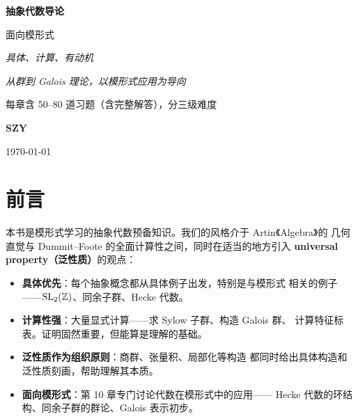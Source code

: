 \documentclass[12pt, a4paper, openany]{book}
\begin{document}
\raggedbottom

\begin{titlepage}

  \centering
  \vspace*{2.2cm}

  {\color{white}\fontsize{36}{44}\selectfont\bfseries 抽象代数导论\par}
  \vspace{0.4cm}
  {\color{white!90}\LARGE 面向模形式\par}
  \vspace{0.3cm}
  {\color{white!70}\large\itshape 具体、计算、有动机\par}

  \vspace{3cm}

  {\large\itshape 从群到 Galois 理论，以模形式应用为导向\par}
  \vspace{0.3cm}
  {\normalsize 每章含 50--80 道习题（含完整解答），分三级难度\par}

  \vfill

  {\Large\bfseries SZY\par}
  \vspace{0.3cm}
  {\normalsize \today\par}
  \vspace{2.5cm}
\end{titlepage}

\chapter*{前言}

本书是模形式学习的抽象代数预备知识。我们的风格介于 Artin《Algebra》的
几何直觉与 Dummit--Foote 的全面计算性之间，同时在适当的地方引入
\textbf{universal property（泛性质）}的观点：

\begin{itemize}
  \item \textbf{具体优先}：每个抽象概念都从具体例子出发，特别是与模形式
    相关的例子——$\mathrm{SL}_2(\mathbb{Z})$、同余子群、Hecke 代数。
  \item \textbf{计算性强}：大量显式计算——求 Sylow 子群、构造 Galois 群、
    计算特征标表。证明固然重要，但能算是理解的基础。
  \item \textbf{泛性质作为组织原则}：商群、张量积、局部化等构造
    都同时给出具体构造和泛性质刻画，帮助理解其本质。
  \item \textbf{面向模形式}：第 10 章专门讨论代数在模形式中的应用——
    Hecke 代数的环结构、同余子群的群论、Galois 表示初步。
\end{itemize}
\end{document}
